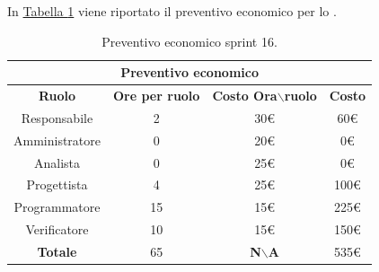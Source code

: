 In \hyperref[tab:sprint16_preventivo_economico]{Tabella \ref{tab:sprint16_preventivo_economico}} viene riportato il preventivo economico per lo .
\begin{table}[H]
    \centering
    \begin{tabular}{|c|c|c|c|}
        \hline
            \multicolumn{4}{|c|}{\textbf{Preventivo economico}} \\ 
        \hline
            \textbf{Ruolo} & \textbf{Ore per ruolo} & \textbf{Costo Ora$\backslash$ruolo} & \textbf{Costo} \\
        \hline
        Responsabile & 2 & 30€ & 60€ \\
        \hline
        Amministratore & 0 & 20€ & 0€ \\
        \hline
        Analista & 0 & 25€ & 0€ \\
        \hline
        Progettista & 4 & 25€ & 100€ \\
        \hline
        Programmatore & 15 & 15€ & 225€ \\
        \hline
        Verificatore & 10 & 15€ & 150€ \\
        \hline 
        \textbf{Totale} & 65 & \textbf{N$\backslash$A} & 535€  \\
        \hline
    \end{tabular}
    \caption{Preventivo economico sprint 16.}
    \label{tab:sprint16_preventivo_economico}
\end{table}